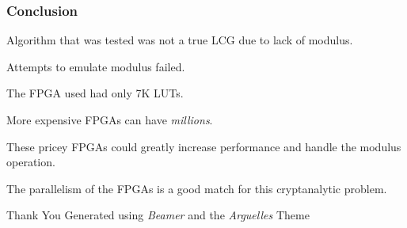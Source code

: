 \documentclass{beamer}
\begin{document}
  \begin{frame}
    \frametitle{Conclusion}

    Algorithm that was tested was not a true LCG due to lack of modulus.

    Attempts to emulate modulus failed.

    \vfill

    The FPGA used had only 7K LUTs.

    More expensive FPGAs can have \textit{millions}.

    \vfill
    
    These pricey FPGAs could greatly increase performance and
    handle the modulus operation.

    \vfill

    The parallelism of the FPGAs is a good match for this cryptanalytic problem.

    
  \end{frame}
   
  \ThankYou
  \begin{frame}
    \AlegreyaSansExtraBold Thank You
    \AlegreyaSansLight \vfill{Generated using \textit{Beamer} and the \textit{Arguelles} Theme}
  \end{frame}
\end{document}
